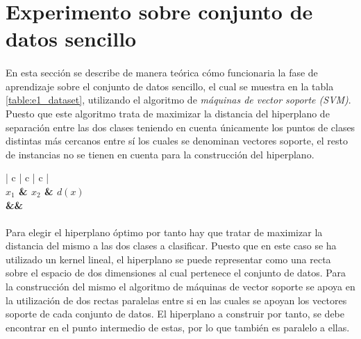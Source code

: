 \documentclass{article}
\begin{document}
	\section{Experimento sobre conjunto de datos sencillo}
	\label{sec:e1}

		\paragraph{}
		En esta sección se describe de manera teórica cómo funcionaria la fase de aprendizaje sobre el conjunto de datos sencillo, el cual se muestra en la tabla \ref{table:e1_dataset}, utilizando el algoritmo de \emph{máquinas de vector soporte (SVM)}. Puesto que este algoritmo trata de maximizar la distancia del hiperplano de separación entre las dos clases teniendo en cuenta únicamente los puntos de clases distintas más cercanos entre sí los cuales se denominan vectores soporte, el resto de instancias no se tienen en cuenta para la construcción del hiperplano.

		\begin{table}
			\centering
			\begin{tabu}{ | c | c | c |}
				\hline
				 \\ \hline
				\bfseries $x_1$ & \bfseries $x_2$ & \bfseries $d(x)$
				{\\\hline\one&\two&\three}
				\\\hline
			\end{tabu}
			\caption{Conjunto de datos Simple}
			\label{table:e1_dataset}
		\end{table}

		\paragraph{}
		Para elegir el hiperplano óptimo por tanto hay que tratar de maximizar la distancia del mismo a las dos clases a clasificar. Puesto que en este caso se ha utilizado un kernel lineal, el hiperplano se puede representar como una recta sobre el espacio de dos dimensiones al cual pertenece el conjunto de datos. Para la construcción del mismo el algoritmo de máquinas de vector soporte se apoya en la utilización de dos rectas paralelas entre si en las cuales se apoyan los vectores soporte de cada conjunto de datos. El hiperplano a construir por tanto, se debe encontrar en el punto intermedio de estas, por lo que también es paralelo a ellas.
\end{document}

